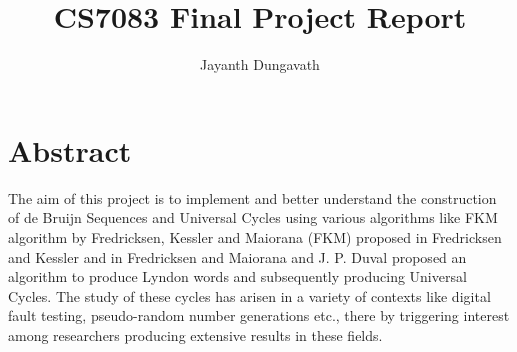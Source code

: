 \documentclass[12pt,twoside]{article}
\title{\textbf{\doctitle}\\
CS7083 Final Project Report}
\author{Jayanth Dungavath}
\begin{document}
\maketitle
\pagebreak



\hfill \break
\hfill \break
\hfill \break
\hfill \break
\hfill \break
\hfill \break
\hfill \break
\hfill \break
\hfill \break
\hfill \break
\hfill \break
\hfill \break
\hfill \break
\hfill \break
\hfill \break
\hfill \break
\hfill \break
\hfill \break
\hfill \break
\hfill \break
\hfill \break
\hfill \break
\hfill \break
\hfill \break
\hfill \break
\hfill \break
\pagebreak

\tableofcontents


\hfill \break
\hfill \break
\hfill \break
\hfill \break
\hfill \break
\hfill \break
\hfill \break
\hfill \break
\hfill \break
\hfill \break
\hfill \break
\hfill \break
\hfill \break
\hfill \break
\hfill \break
\hfill \break
\hfill \break
\hfill \break
\hfill \break
\hfill \break
\hfill \break
\hfill \break
\hfill \break
\hfill \break



\graphicspath{ {/Users/jayanthdeejay/Documents/Edu/UC/Classes/Combinatorics/project/} }

\section{Abstract}
The aim of this project is to implement and better understand the construction of de Bruijn Sequences and Universal Cycles using various algorithms like FKM algorithm by Fredricksen, Kessler and Maiorana (FKM) proposed in Fredricksen and Kessler \cite{FK} and in Fredricksen and Maiorana \cite{FM} and J. P. Duval  \cite{Duval} proposed an algorithm to produce Lyndon words and subsequently producing Universal Cycles. The study of these cycles has arisen in a variety of contexts like digital fault testing, pseudo-random number generations etc., there by triggering interest among researchers producing extensive results in these fields.
\end{document}
